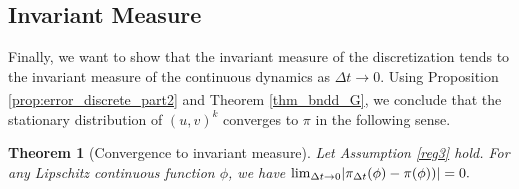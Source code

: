 \documentclass[11pt, twoside]{report}
\newtheorem{theorem}{Theorem}[section]
\begin{document}
\subsection{Invariant Measure}
Finally, we want to show that the invariant measure of the discretization tends to the invariant measure of the continuous dynamics as $\Delta t \xrightarrow[]{} 0$. Using Proposition \ref{prop:error_discrete_part2} and Theorem \ref{thm_bndd_G}, we conclude that the stationary distribution of $(u,v)^k$ converges to $\pi$ in the following sense.

\begin{theorem}[Convergence to invariant measure]\label{thm_convergence_to_invariant}
Let Assumption \ref{reg3} hold. For any Lipschitz continuous function $\phi$, we have
$
\lim_{\deltat \to 0} \abs{\pi_{\tstep}(\phi)- \pi(\phi))} = 0.
$
\end{theorem}
\end{document}

